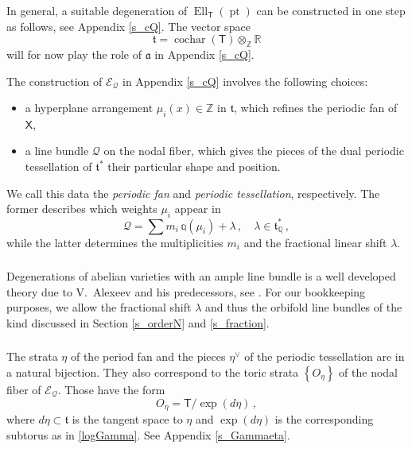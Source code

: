\documentclass[14pt]{extarticle}
\newcommand{\Q}{\mathbb{Q}}
\newcommand{\Z}{\mathbb{Z}}
\newcommand{\R}{\mathbb{R}}
\newcommand{\bT}{\mathsf{T}}
\newcommand{\bX}{\mathsf{X}}
\newcommand{\cQ}{\mathscr{Q}}
\newcommand{\cE}{\mathscr{E}}
\newcommand{\ft}{\mathfrak{t}}
\newcommand{\fa}{\mathfrak{a}}
\newcommand{\Qq}{\mathbb{q}}
\DeclareMathOperator{\Ell}{Ell}
\DeclareMathOperator{\pt}{pt}
\DeclareMathOperator{\cochar}{cochar}
\theoremstyle{definition}
\begin{document}
\subsubsection{}

In general, a suitable degeneration of $\Ell_\bT(\pt)$ can be
constructed in one step as follows, see Appendix \ref{s_cQ}.
The vector space
$$
\ft = \cochar(\bT) \otimes_\Z \R 
$$
will for now play the role of $\fa$ in Appendix \ref{s_cQ}. 

The construction of $\cE_\cQ$ in Appendix \ref{s_cQ} involves the following choices:
\begin{itemize}
\item a hyperplane arrangement $\mu_i(x) \in \Z$ in $\ft$, which
  refines the periodic fan of $\bX$, 
\item a line bundle $\cQ$ on the nodal fiber, which
  gives the pieces of the dual periodic tessellation of $\ft^*$ their particular shape and position.
\end{itemize}

 We call this data the \emph{periodic fan} and \emph{periodic
   tessellation}, respectively. The former
 describes which weights $\mu_i$ appear in
  \begin{equation}
    \cQ = \sum m_i \, \Qq(\mu_i) + \lambda\,, \quad \lambda \in
    \ft^*_\Q \,, 
\label{excQ}
\end{equation}
% 
while the latter determines the
  multiplicities $m_i$ and the
  fractional linear shift $\lambda$.

  \subsubsection{}


Degenerations of abelian varieties with an ample line bundle is a 
well developed theory due to V.~Alexeev and his predecessors, see
\cite{Alex}. For our bookkeeping purposes,
we allow the fractional shift $\lambda$ and thus the orbifold line bundles of the kind discussed in Section
\ref{s_orderN} and \ref{s_fraction}. 

\subsubsection{} 

The strata $\eta$ of the period fan and the pieces $\eta^\vee$ of the
periodic tessellation are in a natural bijection. They also correspond
to the toric strata $\left\{ O_{\eta} \right\}$ of the nodal fiber of
$\cE_\cQ$.  Those have
the form
$$
O_{\eta} = \bT/\exp(d\eta)\,, 
$$
where $d\eta \subset \ft$ is the tangent space to $\eta$ and
$\exp(d\eta)$ is the corresponding subtorus as in \eqref{logGamma}.
See Appendix \ref{s_Gammaeta}.
\end{document}
